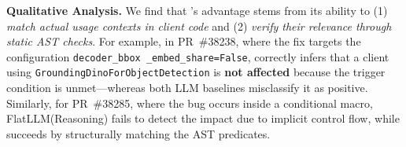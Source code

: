 

\noindent\textbf{Qualitative Analysis.}
We find that \appname’s advantage stems from its ability to (1) \textit{match actual usage contexts in client code} and (2) \textit{verify their relevance through static AST checks}.
For example, in PR~\#38238, where the fix targets the configuration \texttt{decoder\_bbox \_embed\_share=False}, \appname correctly infers that a client using \texttt{GroundingDinoForObjectDetection} is \textbf{not affected} because the trigger condition is unmet—whereas both LLM baselines misclassify it as positive.
Similarly, for PR~\#38285, where the bug occurs inside a conditional macro, FlatLLM(Reasoning) fails to detect the impact due to implicit control flow, while \appname succeeds by structurally matching the AST predicates.


